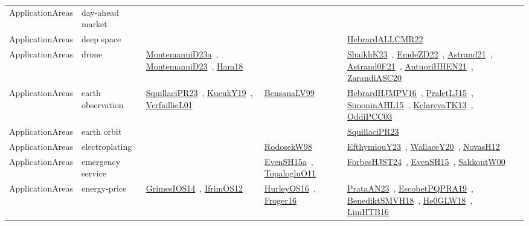 {\begin{longtable}{lp{3cm}>{\raggedright\arraybackslash}p{6cm}>{\raggedright\arraybackslash}p{6cm}>{\raggedright\arraybackslash}p{8cm}}
ApplicationAreas & day-ahead market &  &  & \\
ApplicationAreas & deep space &  &  & \href{works/HebrardALLCMR22.pdf}{HebrardALLCMR22}~\cite{HebrardALLCMR22}\\
ApplicationAreas & drone & \href{works/MontemanniD23a.pdf}{MontemanniD23a}~\cite{MontemanniD23a}, \href{works/MontemanniD23.pdf}{MontemanniD23}~\cite{MontemanniD23}, \href{works/Ham18.pdf}{Ham18}~\cite{Ham18} &  & \href{works/ShaikhK23.pdf}{ShaikhK23}~\cite{ShaikhK23}, \href{works/EmdeZD22.pdf}{EmdeZD22}~\cite{EmdeZD22}, \href{works/Astrand21.pdf}{Astrand21}~\cite{Astrand21}, \href{works/Astrand0F21.pdf}{Astrand0F21}~\cite{Astrand0F21}, \href{works/AntuoriHHEN21.pdf}{AntuoriHHEN21}~\cite{AntuoriHHEN21}, \href{works/ZarandiASC20.pdf}{ZarandiASC20}~\cite{ZarandiASC20}\\
ApplicationAreas & earth observation & \href{works/SquillaciPR23.pdf}{SquillaciPR23}~\cite{SquillaciPR23}, \href{works/KucukY19.pdf}{KucukY19}~\cite{KucukY19}, \href{works/VerfaillieL01.pdf}{VerfaillieL01}~\cite{VerfaillieL01} & \href{works/BensanaLV99.pdf}{BensanaLV99}~\cite{BensanaLV99} & \href{works/HebrardHJMPV16.pdf}{HebrardHJMPV16}~\cite{HebrardHJMPV16}, \href{works/PraletLJ15.pdf}{PraletLJ15}~\cite{PraletLJ15}, \href{works/SimoninAHL15.pdf}{SimoninAHL15}~\cite{SimoninAHL15}, \href{works/KelarevaTK13.pdf}{KelarevaTK13}~\cite{KelarevaTK13}, \href{works/OddiPCC03.pdf}{OddiPCC03}~\cite{OddiPCC03}\\
ApplicationAreas & earth orbit &  &  & \href{works/SquillaciPR23.pdf}{SquillaciPR23}~\cite{SquillaciPR23}\\
ApplicationAreas & electroplating &  & \href{works/RodosekW98.pdf}{RodosekW98}~\cite{RodosekW98} & \href{works/EfthymiouY23.pdf}{EfthymiouY23}~\cite{EfthymiouY23}, \href{works/WallaceY20.pdf}{WallaceY20}~\cite{WallaceY20}, \href{works/NovasH12.pdf}{NovasH12}~\cite{NovasH12}\\
ApplicationAreas & emergency service &  & \href{works/EvenSH15a.pdf}{EvenSH15a}~\cite{EvenSH15a}, \href{works/TopalogluO11.pdf}{TopalogluO11}~\cite{TopalogluO11} & \href{works/ForbesHJST24.pdf}{ForbesHJST24}~\cite{ForbesHJST24}, \href{works/EvenSH15.pdf}{EvenSH15}~\cite{EvenSH15}, \href{works/SakkoutW00.pdf}{SakkoutW00}~\cite{SakkoutW00}\\
ApplicationAreas & energy-price & \href{works/GrimesIOS14.pdf}{GrimesIOS14}~\cite{GrimesIOS14}, \href{works/IfrimOS12.pdf}{IfrimOS12}~\cite{IfrimOS12} & \href{works/HurleyOS16.pdf}{HurleyOS16}~\cite{HurleyOS16}, \href{works/Froger16.pdf}{Froger16}~\cite{Froger16} & \href{works/PrataAN23.pdf}{PrataAN23}~\cite{PrataAN23}, \href{works/EscobetPQPRA19.pdf}{EscobetPQPRA19}~\cite{EscobetPQPRA19}, \href{works/BenediktSMVH18.pdf}{BenediktSMVH18}~\cite{BenediktSMVH18}, \href{works/He0GLW18.pdf}{He0GLW18}~\cite{He0GLW18}, \href{works/LimHTB16.pdf}{LimHTB16}~\cite{LimHTB16}\\

\end{longtable}}
